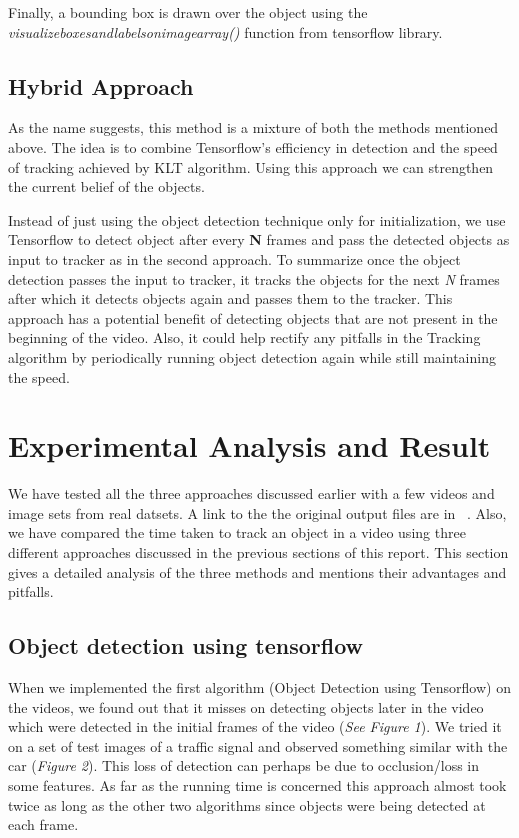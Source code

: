 \documentclass[10pt,twocolumn,letterpaper]{article}
\begin{document}
Finally, a bounding box is drawn over the object using the \textit{visualize\textunderscore boxes\textunderscore and\textunderscore labels\textunderscore on\textunderscore image\textunderscore array()}  function from tensorflow library.



\subsection{Hybrid Approach}
As the name suggests, this method is a mixture of both the methods mentioned above. The idea is to combine Tensorflow's efficiency in detection and the speed of tracking achieved by KLT algorithm. Using this approach we can strengthen the current belief of the objects. 

Instead of just using the object detection technique only for initialization, we use Tensorflow to detect object after every \textbf{N} frames and pass the detected objects as input to tracker as in the second approach.  To summarize once the object detection passes the input to tracker, it tracks the objects for the next \textit{N} frames after which it detects objects again and passes them to the tracker. This approach has a potential benefit of detecting objects that are not present in the beginning of the video. Also, it could help rectify any pitfalls in the Tracking algorithm by periodically running object detection again while still maintaining the speed.

\section{Experimental Analysis and Result}

We have tested all the three approaches discussed earlier with a few  videos and image sets from real datsets. A link to the the original output files are in ~\cite{Videolink}. Also, we have compared the time taken to track an object in a video using three different approaches discussed in the previous sections of this report. This section gives a detailed analysis of the three methods and mentions their advantages and pitfalls.

\subsection{Object detection using tensorflow}  

When we implemented the first algorithm (Object Detection using Tensorflow) on the videos, we found out that it misses on detecting objects later in the video which were detected in the initial frames of the video  (\textit{See Figure 1}). We tried it on a set of test images of a traffic signal and observed something similar with the car 
 (\textit{Figure 2}). This loss of detection can perhaps be due to occlusion/loss in some features. As far as the running time is concerned this approach almost took twice as long as the other two algorithms since objects were being detected at each frame.
\end{document}
